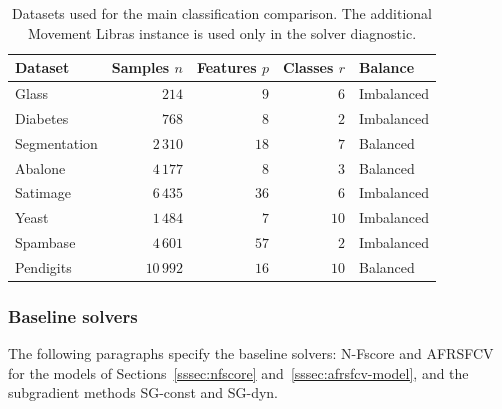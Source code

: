 \documentclass[]{interact}
\theoremstyle{plain}
\theoremstyle{definition}
\theoremstyle{remark}
\begin{document}
\begin{table}[htbp]
\centering
\caption{Datasets used for the main classification comparison. The additional Movement Libras instance is used only in the solver diagnostic.}\label{tab:datasets}
\begin{tabular}{lrrrl}
\toprule
Dataset      & Samples $n$ & Features $p$ & Classes $r$ & Balance    \\
\midrule
Glass        & $214$       & $9$          & $6$         & Imbalanced \\
Diabetes     & $768$       & $8$          & $2$         & Imbalanced \\
Segmentation & $2\,310$    & $18$         & $7$         & Balanced   \\
Abalone      & $4\,177$    & $8$          & $3$         & Balanced   \\
Satimage     & $6\,435$    & $36$         & $6$         & Imbalanced \\
Yeast        & $1\,484$    & $7$          & $10$        & Imbalanced \\
Spambase     & $4\,601$    & $57$         & $2$         & Imbalanced \\
Pendigits    & $10\,992$   & $16$         & $10$        & Balanced   \\
\bottomrule
\end{tabular}
\end{table}
\subsubsection{Baseline solvers}\label{sssec:baselines}
The following paragraphs specify the baseline solvers: N-Fscore and AFRSFCV for the models of Sections~\ref{sssec:nfscore} and~\ref{sssec:afrsfcv-model}, and the subgradient methods SG-const and SG-dyn.
\end{document}
